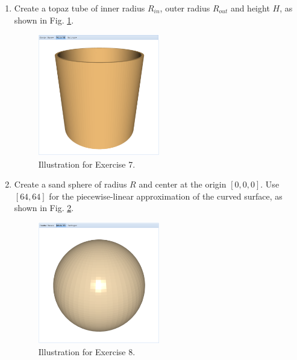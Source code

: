 \documentclass{article}
\begin{document}
\begin{enumerate}
\item Create a topaz tube of inner radius $R_{in}$, outer radius $R_{out}$
and height $H$, as shown in Fig. \ref{fig:a7}.


\begin{figure}[!ht]
\begin{center}
\includegraphics[width=0.5\textwidth]{img/a7-topaz-tube.png}
\end{center}
\vspace{-2mm}
\caption{Illustration for Exercise 7.}
\label{fig:a7}
\end{figure}

\item Create a sand sphere of radius $R$ and center at the origin $[0, 0, 0]$. 
Use $[64, 64]$ for the piecewise-linear approximation of the curved surface, 
as shown in Fig. \ref{fig:a8}.


\begin{figure}[!ht]
\begin{center}
\includegraphics[width=0.5\textwidth]{img/a8-sand-sphere.png}
\end{center}
\vspace{-2mm}
\caption{Illustration for Exercise 8.}
\label{fig:a8}
\vspace{-1cm}
\end{figure}
\newpage


\end{enumerate}
\end{document}

